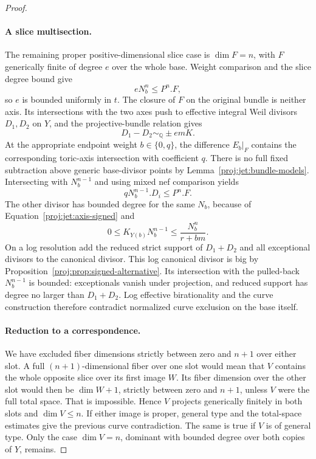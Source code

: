 \documentclass[11pt,letterpaper]{article}
\newcommand{\Q}{\mathbb{Q}}
\theoremstyle{definition}
\theoremstyle{remark}
\begin{document}
\begin{proof}
\paragraph{A slice multisection.}
The remaining proper positive-dimensional slice case is
\(\dim F=n\), with \(F\) generically finite of degree \(e\) over
the whole base.  Weight comparison and the slice degree bound give
\[
 eN_b^n\le P^n.F,
\]
so \(e\) is bounded uniformly in \(t\).
The closure of \(F\) on the original bundle is neither axis.
Its intersections with the two axes push to effective integral
Weil divisors \(D_1,D_2\) on \(Y\), and the projective-bundle
relation gives
\begin{equation}\label{proj:jet:axis-signed}
 D_1-D_2\sim_{\Q} \pm emK.
\end{equation}
At the appropriate endpoint weight \(b\in\{0,q\}\), the difference
\(E_b|_F\) contains the corresponding toric-axis intersection with
coefficient \(q\).  There is no full fixed subtraction above
generic base-divisor points by Lemma~\ref{proj:jet:bundle-models}.
Intersecting with \(N_b^{n-1}\) and using mixed nef comparison yields
\[
 qN_b^{n-1}.D_i\le P^n.F.
\]
The other divisor has bounded degree for the same \(N_b\), because
of Equation~\eqref{proj:jet:axis-signed} and
\[
 0\le K_{Y(b)}N_b^{n-1}\le\frac{N_b^n}{r+bm}.
\]
On a log resolution add the reduced strict support of
\(D_1+D_2\) and all exceptional divisors to the canonical divisor.
This log canonical divisor is big by
Proposition~\ref{proj:prop:signed-alternative}.
Its intersection with the pulled-back \(N_b^{n-1}\) is bounded:
exceptionals vanish under projection, and reduced support has
degree no larger than \(D_1+D_2\).
Log effective birationality and the curve construction therefore
contradict normalized curve exclusion on the base itself.

\paragraph{Reduction to a correspondence.}
We have excluded fiber dimensions strictly between zero and
\(n+1\) over either slot.  A full \((n+1)\)-dimensional fiber over
one slot would mean that \(V\) contains the whole opposite slice
over its first image \(W\).  Its fiber dimension over the other
slot would then be \(\dim W+1\), strictly between zero and \(n+1\),
unless \(V\) were the full total space.  That is impossible.
Hence \(V\) projects generically finitely in both slots and
\(\dim V\le n\).  If either image is proper, general type and the
total-space estimates give the previous curve contradiction.
The same is true if \(V\) is of general type.
Only the case \(\dim V=n\), dominant with bounded degree over both
copies of \(Y\), remains.


\end{proof}
\end{document}

